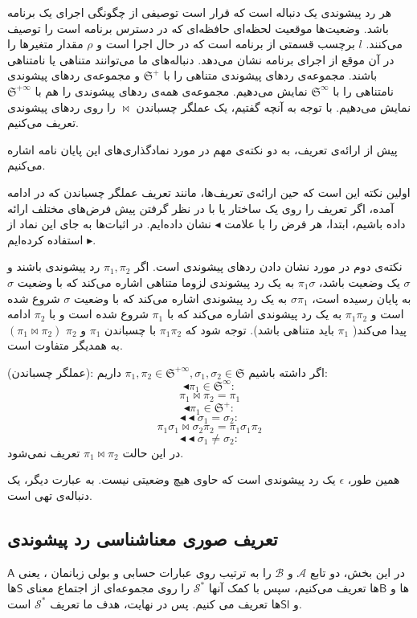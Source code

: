 هر رد پیشوندی یک دنباله است که قرار است توصیفی از چگونگی اجرای یک برنامه باشد. وضعیت‌ها موقعیت لحظه‌ای حافظه‌ا‌ی که در دسترس برنامه است را توصیف می‌کنند. $l$ برچسب قسمتی از برنامه‌ است که در حال اجرا است و $\rho$ مقدار متغیر‌ها را در آن موقع از اجرای برنامه نشان می‌دهد. دنباله‌های ما می‌توانند متناهی یا نامتناهی باشند. مجموعه‌ی ردهای پیشوندی‌ متناهی را با $\mathfrak{S^+}$ و مجموعه‌ی ردهای پیشوندی نامتناهی را با  $\mathfrak{S^\infty}$ نمایش می‌دهیم. مجموعه‌ی همه‌ی ردهای پیشوندی را هم با $\mathfrak{S^{+\infty}}$ نمایش می‌دهیم. 
با توجه به آنچه گفتیم، یک عملگر چسباندن $\Join$ را روی ردهای پیشوندی تعریف می‌کنیم. 

پیش از ارائه‌ی تعریف، به دو نکته‌ی مهم در مورد نمادگذاری‌های این پایان نامه اشاره می‌کنیم.

اولین نکته این است که حین ارائه‌ی تعریف‌ها، مانند تعریف عملگر چسباندن که در ادامه آمده، اگر تعریف را روی یک ساختار یا با در نظر گرفتن پیش فرض‌های مختلف ارائه داده باشیم، ابتدا، هر فرض را با علامت 
$\blacktriangleleft$
نشان داده‌ایم. در اثبات‌ها به جای این نماد از 
$\blacktriangleright$
استفاده کرده‌ایم. 

نکته‌ی دوم در مورد نشان دادن ردهای پیشوندی است. اگر $\pi_1,\pi_2$ رد پیشوندی باشند و $\sigma$ یک وضعیت باشد، $\pi_1\sigma$ به یک رد پیشوندی لزوما متناهی اشاره می‌کند که با وضعیت $\sigma$ به پایان رسیده است،
$\sigma\pi_1$
به یک رد پیشوندی اشاره می‌کند که با وضعیت $\sigma$ شروع شده است و $\pi_1\pi_2$ به یک رد پیشوندی اشاره می‌کند که با $\pi_1$ شروع شده است و با $\pi_2$ ادامه پیدا می‌کند( $\pi_1$ باید متناهی باشد). توجه شود که $\pi_1\pi_2$ با چسباندن $\pi_1$ و $\pi_2$ $(\pi_1 \Join \pi_2)$به همدیگر متفاوت است.

\begin{defn}
	(عملگر چسباندن): اگر داشته باشیم 
	$\pi_1 , \pi_2 \in \mathfrak{S^{+\infty}}  , \sigma_1 ,\sigma_2 \in \mathfrak{S}$
	داریم:
		$$\blacktriangleleft \pi_1 \in \mathfrak{S}^\infty:$$
		$$\pi_1 \Join \pi_2 = \pi_1$$
		$$\blacktriangleleft \pi_1 \in \mathfrak{S}^+:$$
		$$\blacktriangleleft \blacktriangleleft \sigma_1 = \sigma_2:$$
		$$\pi_1\sigma_1 \Join \sigma_2 \pi_2 = \pi_1 \sigma_1 \pi_2$$
		$$\blacktriangleleft \blacktriangleleft \sigma_1 \neq \sigma_2:$$
		در این حالت 
		$\pi_1 \Join \pi_2$
		تعریف نمی‌شود.
\end{defn}
همین طور، $\epsilon$ یک رد پیشوندی است که حاوی هیچ وضعیتی نیست. به عبارت دیگر، یک دنباله‌ی تهی است.

\subsection{تعریف صوری معناشناسی رد پیشوندی}
در این بخش، دو تابع $\mathcal{A}$ و $\mathcal{B}$ را به ترتیب روی عبارات حسابی و بولی زبانمان ، یعنی $\mathsf{A}$ها و $\mathsf{B}$ها تعریف می‌کنیم، سپس با کمک آنها $\mathcal{S^*}$ را روی  مجموعه‌ای از اجتماع معنای $\mathsf{S}$ها و $\mathsf{Sl}$ها تعریف می کنیم. پس در نهایت، هدف ما تعریف  $\mathcal{S^*}$ است.


